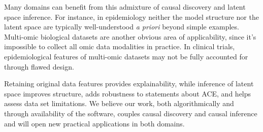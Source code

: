\documentclass[letterpaper]{article}
\begin{document}
Many domains can benefit from this admixture of causal discovery and latent space inference.  For instance, in epidemiology neither the model structure nor the latent space are typically well-understood \textit{a priori} beyond simple examples.  Multi-omic biological datasets are another obvious area of applicability, since it's impossible to collect all omic data modalities in practice.  In clinical trials, epidemiological features of multi-omic datasets may not be fully accounted for through flawed design.   

Retaining original data features provides explainability, while inference of latent space improves structure, adds robustness to statements about ACE, and helps assess data set limitations.  We believe our work, both algorithmically and through availability of the software, couples causal discovery and causal inference and will open new practical applications in both domains.

 
\small

\end{document}
